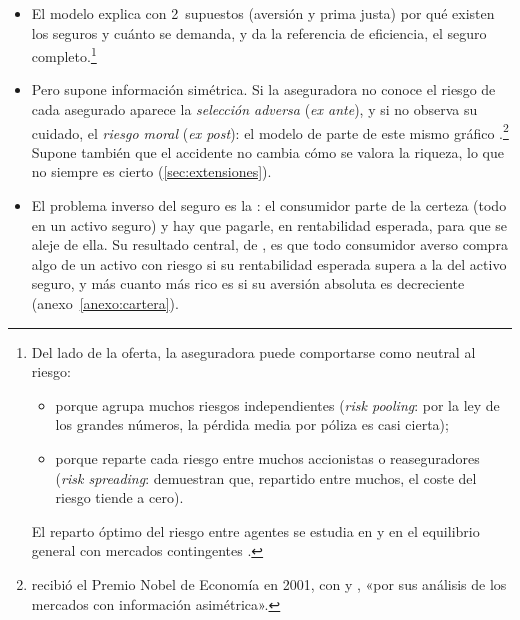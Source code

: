 \documentclass[11pt]{article}
\begin{document}
\begin{itemize}
\item El modelo explica con 2~supuestos (aversión y prima justa) por qué existen los seguros y cuánto se demanda, y da la referencia de eficiencia, el seguro completo.\footnote{Del lado de la oferta, la aseguradora puede comportarse como neutral al riesgo:
\begin{itemize}
\item porque agrupa muchos riesgos independientes (\emph{risk pooling}: por la ley de los grandes números, la pérdida media por póliza es casi cierta);
\item porque reparte cada riesgo entre muchos accionistas o reaseguradores (\emph{risk spreading}: \textcite{ArrowLind1970Uncertainty} demuestran que, repartido entre muchos, el coste del riesgo tiende a cero).
\end{itemize}
El reparto óptimo del riesgo entre agentes se estudia en \textcite{GravelleRees2004Microeconomics} y en el equilibrio general con mercados contingentes .}
\item Pero supone información simétrica. Si la aseguradora no conoce el riesgo de cada asegurado aparece la \emph{selección adversa} (\emph{ex ante}), y si no observa su cuidado, el \emph{riesgo moral} (\emph{ex post}): el modelo de \textcite{RothschildStiglitz1976Equilibrium} parte de este mismo gráfico .\footnote{ recibió el Premio Nobel de Economía en 2001, con  y , «por sus análisis de los mercados con información asimétrica»\nocite{Nobel2001AkerlofSpenceStiglitz}.} Supone también que el accidente no cambia cómo se valora la riqueza, lo que no siempre es cierto (\ref{sec:extensiones}).
\item El problema inverso del seguro es la : el consumidor parte de la certeza (todo en un activo seguro) y hay que pagarle, en rentabilidad esperada, para que se aleje de ella. Su resultado central, de \textcite{Arrow1965Aspects}, es que todo consumidor averso compra algo de un activo con riesgo si su rentabilidad esperada supera a la del activo seguro, y más cuanto más rico es si su aversión absoluta es decreciente (anexo~\ref{anexo:cartera}).
\end{itemize}
\end{document}

